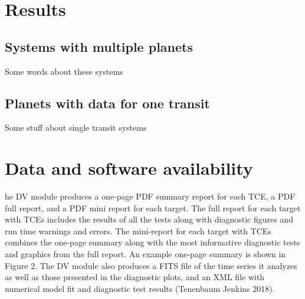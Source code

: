 \documentclass[linenumbers,floatfix,ApJL,twocolumn]{aastex631}
\begin{document}
%
%
%
%






\section{Results}\label{sec:results}



\subsection{Systems with multiple planets}
Some words about these systems

\subsection{Planets with data for one transit}
Some stuff about single transit systems


\section{Data and software availability}\label{sec:data}

he DV module produces a one-page PDF summary report for each TCE, a PDF full report, and a PDF mini report for each target. The full report for each target with TCEs includes the results of all the tests along with diagnostic figures and run time warnings and errors. The mini-report for each target with TCEs combines the one-page summary along with the most informative diagnostic tests and graphics from the full report. An example one-page summary is shown in Figure 2. The DV module also produces a FITS file of the time series it analyzes as well as those presented in the diagnostic plots, and an XML file with numerical model fit and diagnostic test results (Tenenbaum  Jenkins 2018).
\end{document}
